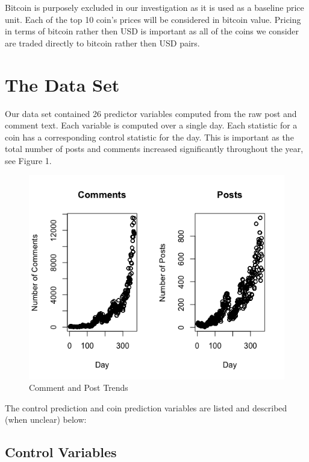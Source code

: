 \documentclass[12pt]{article}
\begin{document}
\indent Bitcoin is purposely excluded in our investigation as it is used as a baseline price unit. Each of the top 10 coin's prices will be considered in bitcoin value. Pricing in terms of bitcoin rather then USD is important as all of the coins we consider are traded directly to bitcoin rather then USD pairs.




\section{The Data Set}\label{dataset}

\indent \indent Our data set contained 26 predictor variables computed from the raw post and comment text. Each variable is computed over a single day. Each statistic for a coin has a corresponding control statistic for the day. This is important as the total number of posts and comments increased significantly throughout the year, see Figure 1.

\begin{figure}

\centering
  \includegraphics[width=\linewidth]{images/TotalCommentsPosts.png}
 \caption{Comment and Post Trends}
\label{label}

\end{figure}

The control prediction and coin prediction variables are listed and described (when unclear) below:

\subsection{Control Variables}
\end{document}
